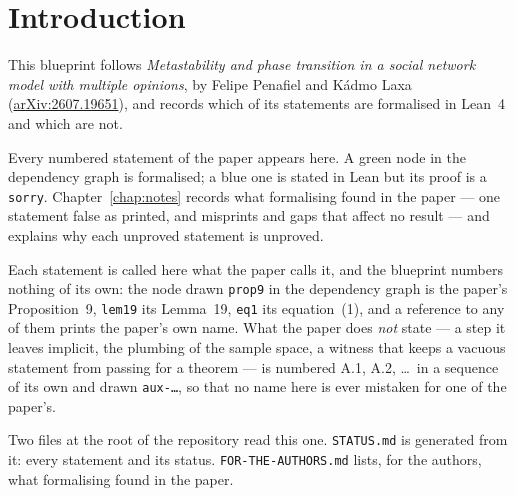 
\chapter{Introduction}

This blueprint follows \emph{Metastability and phase transition in a social
network model with multiple opinions}, by Felipe Penafiel and Kádmo Laxa
(\href{https://arxiv.org/abs/2607.19651}{arXiv:2607.19651}), and records which
of its statements are formalised in Lean~4 and which are not.

Every numbered statement of the paper appears here.  A green node in the
dependency graph is formalised; a blue one is stated in Lean but its proof is
a \texttt{sorry}.  Chapter~\ref{chap:notes} records what formalising found in
the paper --- one statement false as printed, and misprints and gaps that affect
no result --- and explains why each unproved statement is unproved.

Each statement is called here what the paper calls it, and the blueprint
numbers nothing of its own: the node drawn \texttt{prop9} in the dependency
graph is the paper's Proposition~9, \texttt{lem19} its Lemma~19, \texttt{eq1}
its equation~(1), and a reference to any of them prints the paper's own name.
What the paper does \emph{not} state --- a step it leaves implicit, the
plumbing of the sample space, a witness that keeps a vacuous statement from
passing for a theorem --- is numbered A.1, A.2, \dots\ in a sequence of its own
and drawn \texttt{aux-\dots}, so that no name here is ever mistaken for one of
the paper's.

Two files at the root of the repository read this one.  \texttt{STATUS.md} is
generated from it: every statement and its status.  \texttt{FOR-THE-AUTHORS.md}
lists, for the authors, what formalising found in the paper.

